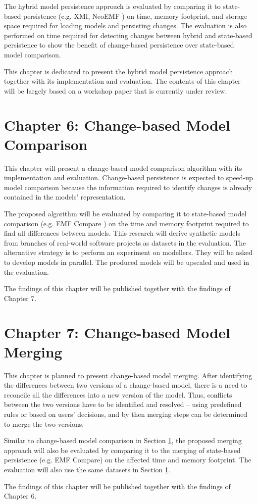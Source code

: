 The hybrid model persistence approach is evaluated by comparing it to state-based persistence (e.g. XMI, NeoEMF \cite{daniel2016neoemf}) on time, memory footprint, and storage space required for loading models and persisting changes. The evaluation is also performed on time required for detecting changes between hybrid and state-based persistence to show the benefit of change-based persistence over state-based model comparison. 

This chapter is dedicated to present the hybrid model persistence approach together with its implementation and evaluation. The contents of this chapter will be largely based on a workshop paper \cite{DBLP:conf/models/YohannisRPK18} that is currently under review. 

\section{Chapter 6: Change-based Model Comparison}
\label{sec:chapter_6_change_based_model_comparison}
This chapter will present a change-based model comparison algorithm with its implementation and evaluation. Change-based persistence is expected to speed-up model comparison because the information required to identify changes is already contained in the models' representation. 

The proposed algorithm will be evaluated by comparing it to state-based model comparison (e.g. EMF Compare \cite{eclipse2017compare}) on the time and memory footprint required to find all differences between models. This research will derive synthetic models from branches of real-world software projects as datasets in the evaluation. The alternative strategy is to perform an experiment on modellers. They will be asked to develop models in parallel. The produced models will be upscaled and used in the evaluation. 

The findings of this chapter will be published together with the findings of Chapter 7.


\section{Chapter 7: Change-based Model Merging}
\label{sec:chapter_7_change_based_model_Merging}
This chapter is planned to present change-based model merging. After identifying the differences between two versions of a change-based model, there is a need to reconcile all the differences into a new version of the model. Thus, conflicts between the two versions have to be identified and resolved -- using predefined rules or based on users' decisions, and by then merging steps can be determined to merge the two versions. 

Similar to change-based model comparison in Section \ref{sec:chapter_6_change_based_model_comparison}, the proposed merging approach will also be evaluated by comparing it to the merging of state-based persistence (e.g. EMF Compare) on the affected time and memory footprint. The evaluation will also use the same datasets in Section \ref{sec:chapter_6_change_based_model_comparison}.

The findings of this chapter will be published together with the findings of Chapter 6.